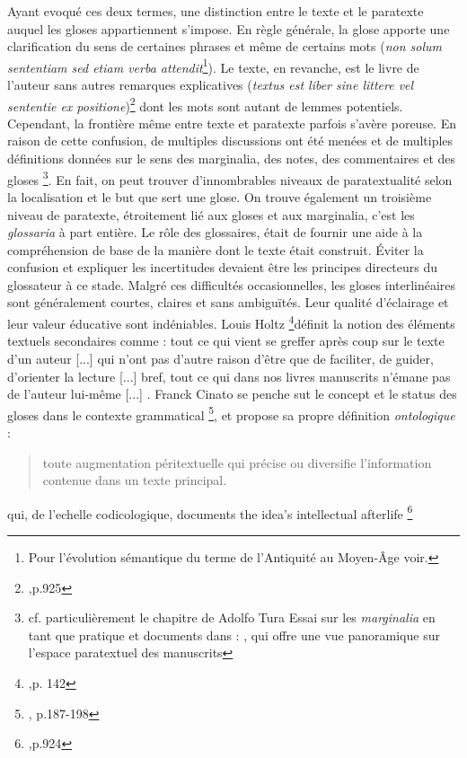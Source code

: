 \documentclass[a4paper, twoside, 12pt]{book}
\begin{document}
Ayant evoqué ces deux termes, une distinction entre le texte et le paratexte auquel les gloses appartiennent s'impose. 
En règle générale, la glose apporte une clarification du sens de certaines phrases et même de certains mots (\textit{non solum sententiam sed etiam verba attendit}\footnote{Pour l'évolution sémantique du terme de l'Antiquité au Moyen-Âge voir.\cite{holtz1996glossaires}}). Le texte, en revanche, est le livre de l'auteur sans autres remarques explicatives (\textit{textus est liber sine littere vel sententie ex positione})\footnote{\cite{dinkova2020text},p.925} dont les mots sont autant de lemmes potentiels. Cependant, la frontière même entre texte et paratexte parfois s'avère poreuse. En raison de cette confusion, de multiples discussions ont été menées et de multiples définitions données sur le sens des marginalia, des notes, des commentaires et des gloses \footnote{cf. particulièrement le chapitre de Adolfo Tura \og{} Essai sur les \textit{marginalia} en tant que pratique et documents \fg{} dans : \cite{jacquart2005scientia}, qui offre une vue panoramique sur l'espace paratextuel des manuscrits}. En fait, on peut trouver d'innombrables \og{}niveaux de paratextualité \fg{} selon la localisation et le but que sert une glose. On trouve également un troisième niveau de paratexte, étroitement lié aux gloses et aux marginalia, c'est les \textit{glossaria} à part entière. Le rôle des glossaires, était de fournir une aide à la compréhension de base de la manière dont le texte était construit. 
Éviter la confusion et expliquer les incertitudes devaient être les principes directeurs du glossateur à ce stade. Malgré ces difficultés occasionnelles, les gloses interlinéaires sont généralement courtes, claires et sans ambiguïtés. Leur qualité d'éclairage et leur valeur éducative sont indéniables. Louis Holtz \footnote{\cite{holtz1984gloses},p. 142}définit la notion des éléments textuels secondaires comme : \og{} tout ce qui vient se greffer après coup sur le texte d’un auteur [...] qui n’ont pas d’autre raison d’être que de faciliter, de guider, d’orienter la lecture [...] bref, tout ce qui dans nos livres manuscrits n’émane pas de l’auteur lui-même [...] \fg{}. Franck Cinato se penche sut le concept et le status des gloses dans le contexte grammatical \footnote{\cite{cinato2015priscien}, p.187-198}, et propose sa propre définition \textit{ontologique} : \blockquote{toute augmentation péritextuelle qui précise ou
diversifie l’information contenue dans un texte principal.} qui,  de l'echelle codicologique, \og{} documents the idea’s intellectual afterlife \footnote{\cite{dinkova2020text},p.924}\fg{}
\end{document}
